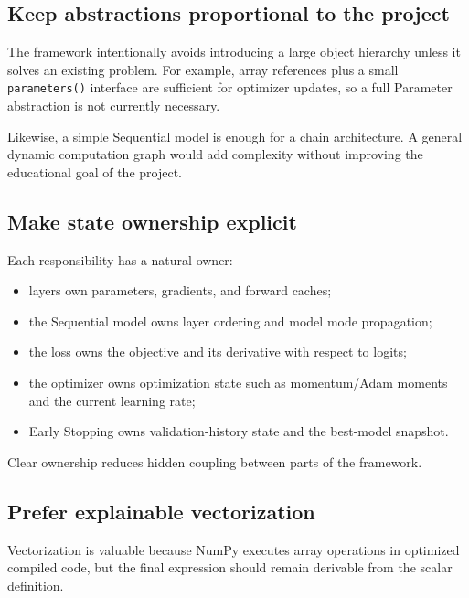 \documentclass[11pt,a4paper]{article}
\newcommand{\code}[1]{\texttt{#1}}
\begin{document}
\subsection{Keep abstractions proportional to the project}

The framework intentionally avoids introducing a large object hierarchy unless it solves an existing problem. For example, array references plus a small \code{parameters()} interface are sufficient for optimizer updates, so a full Parameter abstraction is not currently necessary.

Likewise, a simple Sequential model is enough for a chain architecture. A general dynamic computation graph would add complexity without improving the educational goal of the project.

\subsection{Make state ownership explicit}

Each responsibility has a natural owner:
\begin{itemize}
    \item layers own parameters, gradients, and forward caches;
    \item the Sequential model owns layer ordering and model mode propagation;
    \item the loss owns the objective and its derivative with respect to logits;
    \item the optimizer owns optimization state such as momentum/Adam moments and the current learning rate;
    \item Early Stopping owns validation-history state and the best-model snapshot.
\end{itemize}

Clear ownership reduces hidden coupling between parts of the framework.

\subsection{Prefer explainable vectorization}

Vectorization is valuable because NumPy executes array operations in optimized compiled code, but the final expression should remain derivable from the scalar definition.
\end{document}
